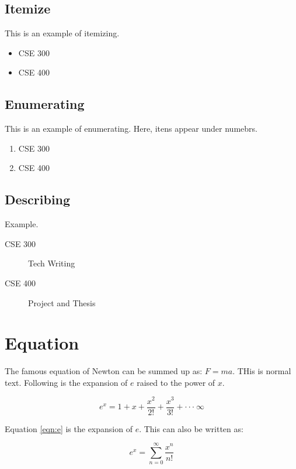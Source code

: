 \documentclass{book}
\begin{document}
\subsection{Itemize}

This is an example of itemizing.

\begin{itemize}
    \item CSE 300
    \item CSE 400
\end{itemize}

\subsection{Enumerating}

This is an example of enumerating. Here, itens appear under numebrs.

\begin{enumerate}
    \item CSE 300
    \item CSE 400
\end{enumerate}

\subsection{Describing}

Example.

\begin{description}
    \item[CSE 300] Tech Writing
    \item[CSE 400] Project and Thesis
\end{description}


\section{Equation}

The famous equation of Newton can be summed up as: $F = ma$. THis is normal text. Following is the expansion of $e$ raised to the power of $x$.

\begin{equation}
    e ^ x = 1 + x + \frac{x ^ 2}{ 2 !} + \frac{x ^ 3}{3!} + \cdot \cdot \cdot ~ \infty
    \label{eqn:e}
\end{equation}

Equation \ref{eqn:e} is the expansion of $e$. This can also be written as:

\begin{equation}
    e ^ x = \sum_{n=0}^{\infty} \frac{x ^ n}{n !}
\end{equation}
\end{document}
